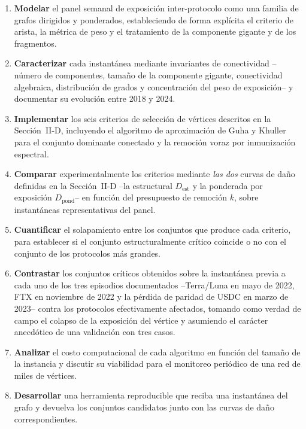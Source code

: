 \documentclass[journal]{IEEEtran}
\begin{document}
\begin{enumerate}
\item \textbf{Modelar} el panel semanal de exposición inter-protocolo como una
      familia de grafos dirigidos y ponderados, estableciendo de forma explícita
      el criterio de arista, la métrica de peso y el tratamiento de la
      componente gigante y de los fragmentos.

\item \textbf{Caracterizar} cada instantánea mediante invariantes de conectividad
      --número de componentes, tamaño de la componente gigante, conectividad
      algebraica, distribución de grados y concentración del peso de exposición--
      y documentar su evolución entre 2018 y 2024.

\item \textbf{Implementar} los seis criterios de selección de vértices descritos
      en la Sección~II-D, incluyendo el algoritmo de aproximación de Guha y
      Khuller para el conjunto dominante conectado y la remoción voraz por
      inmunización espectral.

\item \textbf{Comparar} experimentalmente los criterios mediante \emph{las dos}
      curvas de daño definidas en la Sección~II-D --la estructural
      $D_{\text{est}}$ y la ponderada por exposición $D_{\text{pond}}$-- en
      función del presupuesto de remoción $k$, sobre instantáneas representativas
      del panel.

\item \textbf{Cuantificar} el solapamiento entre los conjuntos que produce cada
      criterio, para establecer si el conjunto estructuralmente crítico coincide
      o no con el conjunto de los protocolos más grandes.

\item \textbf{Contrastar} los conjuntos críticos obtenidos sobre la instantánea
      previa a cada uno de los tres episodios documentados --Terra/Luna en mayo de
      2022, FTX en noviembre de 2022 y la pérdida de paridad de USDC en marzo de
      2023-- contra los protocolos efectivamente afectados, tomando como verdad de
      campo el colapso de la exposición del vértice y asumiendo el carácter
      anecdótico de una validación con tres casos.

\item \textbf{Analizar} el costo computacional de cada algoritmo en función del
      tamaño de la instancia y discutir su viabilidad para el monitoreo periódico
      de una red de miles de vértices.

\item \textbf{Desarrollar} una herramienta reproducible que reciba una
      instantánea del grafo y devuelva los conjuntos candidatos junto con las
      curvas de daño correspondientes.
\end{enumerate}
\end{document}
